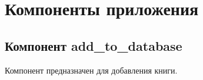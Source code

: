 \documentclass[letterpaper,10pt,russian]{sphinxmanual}
\begin{document}
\section{Компоненты приложения}
\label{\detokenize{blueprints:id1}}\label{\detokenize{blueprints::doc}}

\subsection{Компонент add\_to\_database}
\label{\detokenize{blueprints:add-to-database}}
\begin{DUlineblock}{0em}
\item[] Компонент предназначен для добавления книги.
\end{DUlineblock}
\label{\detokenize{blueprints:module-blueprints.add_to_database}}
\end{document}
